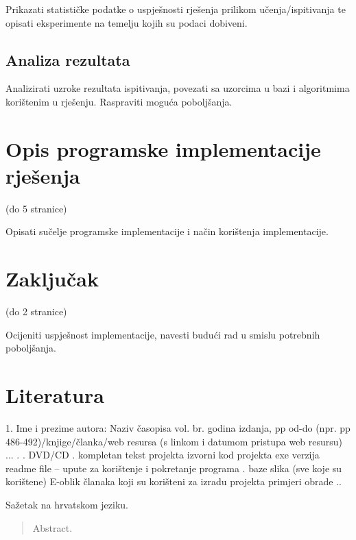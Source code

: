 \documentclass[times, utf8, diplomski]{fer}
\begin{document}
Prikazati statističke podatke o uspješnosti rješenja prilikom učenja/ispitivanja te opisati eksperimente na temelju kojih su podaci dobiveni.

\section{Analiza rezultata}

Analizirati uzroke rezultata ispitivanja, povezati sa uzorcima u bazi i algoritmima korištenim u rješenju. Raspraviti moguća poboljšanja.

\chapter{Opis programske implementacije rješenja}

(do 5 stranice)

Opisati sučelje programske implementacije i način korištenja implementacije.


\chapter{Zaključak}

(do 2 stranice)

Ocijeniti uspješnost implementacije, navesti budući rad u smislu potrebnih poboljšanja. 


\chapter{Literatura}

1. Ime i prezime autora: Naziv časopisa vol. br. godina izdanja, pp od-do (npr. pp 486-492)/knjige/članka/web resursa (s linkom i datumom pristupa web resursu)
...
.
.
DVD/CD  
.
kompletan tekst projekta
izvorni kod projekta
exe verzija
readme file – upute za korištenje i pokretanje programa
.
baze slika (sve koje su korištene)
E-oblik članaka koji su korišteni za izradu projekta
primjeri obrade
..






\begin{sazetak}
Sažetak na hrvatskom jeziku.

\end{sazetak}

\begin{abstract}
Abstract.

\end{abstract}
\end{document}
